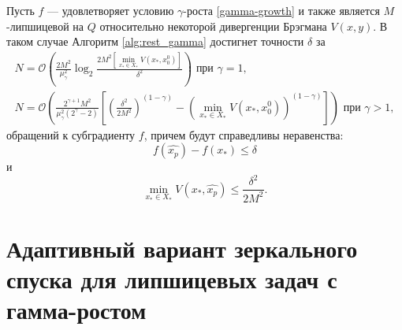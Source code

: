     \begin{remark}
        Пусть $f$ --- удовлетворяет условию $\gamma$-роста \eqref{gamma-growth} и также является $M$-липшицевой на $Q$ относительно некоторой дивергенции Брэгмана $V(x, y)$. В таком случае Алгоритм \ref{alg:rest_gamma} достигнет точности $\delta$ за
        \begin{equation}
            \begin{aligned}
               N = \mathcal{O}\left(\frac{2 M^2}{\mu_{\gamma}^2} \log_2{\frac{2 M^2 \left[\min\limits_{x_* \in X_*}{V(x_*, x_0^0)}\right]}{\delta^2}}\right) \text{ при } \gamma = 1, \\
               N = \mathcal{O}\left(\frac{2^{\gamma + 1} M^2}{\mu_{\gamma}^2 (2^{\gamma} - 2)} \left[\left(\frac{\delta^2}{2 M^2}\right)^{(1 - \gamma)} - \left(\min\limits_{x_* \in X_*}{V(x_*, x_0^0)}\right)^{(1 - \gamma)}\right]\right) \text{ при } \gamma > 1,
            \end{aligned}
        \end{equation}
        обращений к субградиенту $f$, причем будут справедливы неравенства:
        \begin{equation}
           f(\widehat{x_p}) - f(x_*)  \leq \delta 
        \end{equation}
        и
        \begin{equation}
           \min\limits_{x_* \in X_*}{V(x_*, \widehat{x_p})} \leq \frac{\delta^2}{2 M^2}.
        \end{equation}
    \end{remark}

\section{Адаптивный вариант зеркального спуска для липшицевых задач с гамма-ростом}\label{sec:ch3/sect4}


